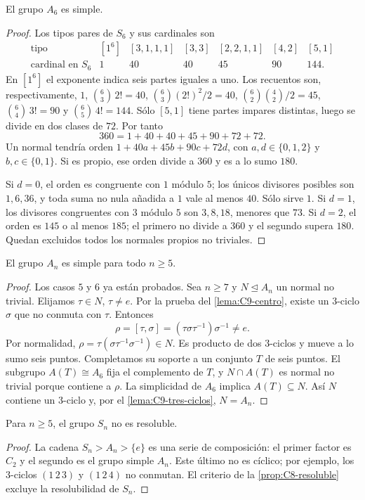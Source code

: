 \begin{lema}[Simplicidad de $A_6$]\label{lema:C9-A6}
El grupo $A_6$ es simple.
\end{lema}
\begin{proof}
Los tipos pares de $S_6$ y sus cardinales son
\begingroup
\renewcommand{\arraystretch}{1.2}
\[
\begin{array}{c|rrrrrr}
\text{tipo}&[1^6]&[3,1,1,1]&[3,3]&[2,2,1,1]&[4,2]&[5,1]\\[2pt]\hline
\text{cardinal en }S_6&1&40&40&45&90&144.
\end{array}
\]
\endgroup
En $[1^6]$ el exponente indica seis partes iguales a uno. Los recuentos son, respectivamente, $1$, $\binom63\,2!=40$, $\binom63(2!)^2/2=40$, $\binom62\binom42/2=45$, $\binom64\,3!=90$ y $\binom65\,4!=144$. Sólo $[5,1]$ tiene partes impares distintas, luego se divide en dos clases de $72$. Por tanto
\[
360=1+40+40+45+90+72+72.
\]
Un normal tendría orden $1+40a+45b+90c+72d$, con $a,d\in\{0,1,2\}$ y $b,c\in\{0,1\}$. Si es propio, ese orden divide a $360$ y es a lo sumo $180$.

Si $d=0$, el orden es congruente con $1$ módulo $5$; los únicos divisores posibles son $1,6,36$, y toda suma no nula añadida a $1$ vale al menos $40$. Sólo sirve $1$. Si $d=1$, los divisores congruentes con $3$ módulo $5$ son $3,8,18$, menores que $73$. Si $d=2$, el orden es $145$ o al menos $185$; el primero no divide a $360$ y el segundo supera $180$. Quedan excluidos todos los normales propios no triviales.
\end{proof}

\begin{teo}\label{teo:C9-simple}
El grupo $A_n$ es simple para todo $n\ge5$.
\end{teo}
\begin{proof}
Los casos $5$ y $6$ ya están probados. Sea $n\ge7$ y $N\trianglelefteq A_n$ un normal no trivial. Elijamos $\tau\in N$, $\tau\ne e$. Por la prueba del \cref{lema:C9-centro}, existe un $3$-ciclo $\sigma$ que no conmuta con $\tau$. Entonces
\[
\rho=[\tau,\sigma]=(\tau\sigma\tau^{-1})\sigma^{-1}\ne e.
\]
Por normalidad, $\rho=\tau(\sigma\tau^{-1}\sigma^{-1})\in N$. Es producto de dos $3$-ciclos y mueve a lo sumo seis puntos. Completamos su soporte a un conjunto $T$ de seis puntos. El subgrupo $A(T)\cong A_6$ fija el complemento de $T$, y $N\cap A(T)$ es normal no trivial porque contiene a $\rho$. La simplicidad de $A_6$ implica $A(T)\subseteq N$. Así $N$ contiene un $3$-ciclo y, por el \cref{lema:C9-tres-ciclos}, $N=A_n$.
\end{proof}

\begin{coro}
Para $n\ge5$, el grupo $S_n$ no es resoluble.
\end{coro}
\begin{proof}
La cadena $S_n>A_n>\{e\}$ es una serie de composición: el primer factor es $C_2$ y el segundo es el grupo simple $A_n$. Este último no es cíclico; por ejemplo, los $3$-ciclos $(1\,2\,3)$ y $(1\,2\,4)$ no conmutan. El criterio de la \cref{prop:C8-resoluble} excluye la resolubilidad de $S_n$.
\end{proof}
